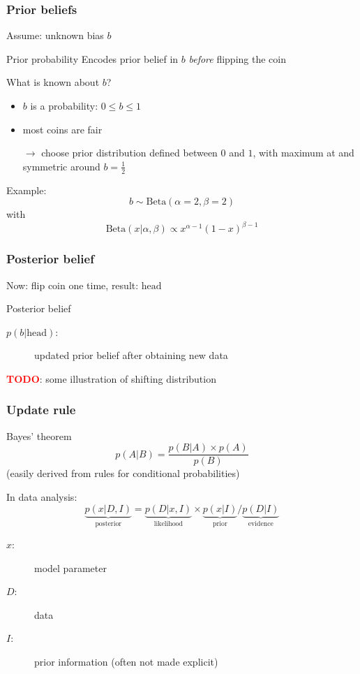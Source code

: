 \documentclass[t]{beamer}
\newcommand{\todo}{\textcolor{red}{\textbf{TODO}}}
\begin{document}
\begin{frame}
  \frametitle{Prior beliefs}
  Assume: unknown bias $b$
  \begin{block}{Prior probability}
    Encodes prior belief in $b$ \textit{before} flipping the coin
  \end{block}
  What is known about $b$?
  \begin{itemize}
  \item $b$ is a probability: $0 \leq b \leq 1$
  \item most coins are fair
  \end{itemize}
  \begin{itemize}
  \item[$\rightarrow$] choose prior distribution defined between $0$ and $1$, with maximum at and symmetric around $b=\frac{1}{2}$
  \end{itemize}
  Example:
  \begin{equation*}
    b \sim \mathrm{Beta}(\alpha=2,\beta=2)
  \end{equation*}
  with
  \begin{equation*}
    \mathrm{Beta}(x|\alpha, \beta) \propto x^{\alpha-1}(1-x)^{\beta-1}
  \end{equation*}
\end{frame}


\begin{frame}
  \frametitle{Posterior belief}
  Now: flip coin one time, result: $\mathrm{head}$
  \begin{block}{Posterior belief}
    \begin{description}
      \item[$p(b|\mathrm{head})$:] updated prior belief after obtaining new data
    \end{description}
  \end{block}
  \todo: some illustration of shifting distribution
\end{frame}


\begin{frame}
  \frametitle{Update rule}
  \begin{block}{Bayes' theorem}
    \begin{equation*}
      p(A|B) = \frac{p(B|A) \times p(A)}{p(B)}
    \end{equation*}
    (easily derived from rules for conditional probabilities)
  \end{block}
  In data analysis:
  \begin{equation*}
    \underbrace{p(x|D,I)}_{\mathrm{posterior}} = \underbrace{p(D|x,I)}_{\mathrm{likelihood}} \times \underbrace{p(x|I)}_{\mathrm{prior}} / \underbrace{p(D|I)}_{\mathrm{evidence}}
  \end{equation*}
  \begin{description}
  \item[$x$:] model parameter
  \item[$D$:] data
  \item[$I$:] prior information (often not made explicit)
  \end{description}
\end{frame}
\end{document}
